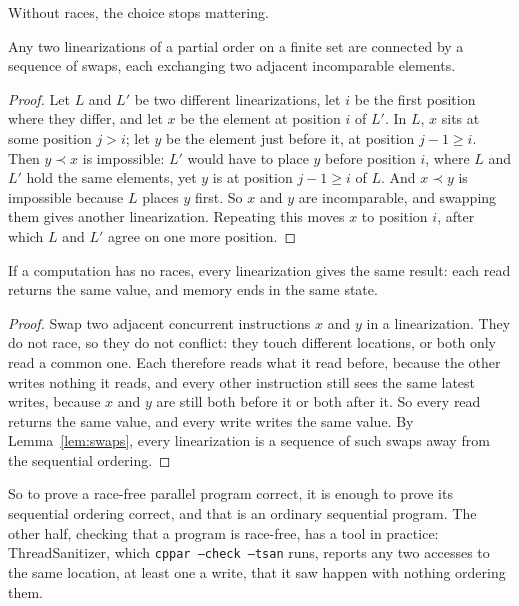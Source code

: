 Without races, the choice stops mattering.

\begin{lemma}
\label{lem:swaps}
Any two linearizations of a partial order on a finite set are connected by a sequence of swaps, each exchanging two adjacent incomparable elements.
\end{lemma}

\begin{proof}
Let $L$ and $L'$ be two different linearizations, let $i$ be the first position where they differ, and let $x$ be the element at position $i$ of $L'$. In $L$, $x$ sits at some position $j > i$; let $y$ be the element just before it, at position $j - 1 \ge i$. Then $y \prec x$ is impossible: $L'$ would have to place $y$ before position $i$, where $L$ and $L'$ hold the same elements, yet $y$ is at position $j - 1 \ge i$ of $L$. And $x \prec y$ is impossible because $L$ places $y$ first. So $x$ and $y$ are incomparable, and swapping them gives another linearization. Repeating this moves $x$ to position $i$, after which $L$ and $L'$ agree on one more position.
\end{proof}

\begin{theorem}
\label{thm:race-free}
If a computation has no races, every linearization gives the same result: each read returns the same value, and memory ends in the same state.
\end{theorem}

\begin{proof}
Swap two adjacent concurrent instructions $x$ and $y$ in a linearization. They do not race, so they do not conflict: they touch different locations, or both only read a common one. Each therefore reads what it read before, because the other writes nothing it reads, and every other instruction still sees the same latest writes, because $x$ and $y$ are still both before it or both after it. So every read returns the same value, and every write writes the same value. By Lemma~\ref{lem:swaps}, every linearization is a sequence of such swaps away from the sequential ordering.
\end{proof}

So to prove a race-free parallel program correct, it is enough to prove its sequential ordering correct, and that is an ordinary sequential program. The other half, checking that a program is race-free, has a tool in practice: ThreadSanitizer, which \texttt{cppar --check --tsan} runs, reports any two accesses to the same location, at least one a write, that it saw happen with nothing ordering them.


